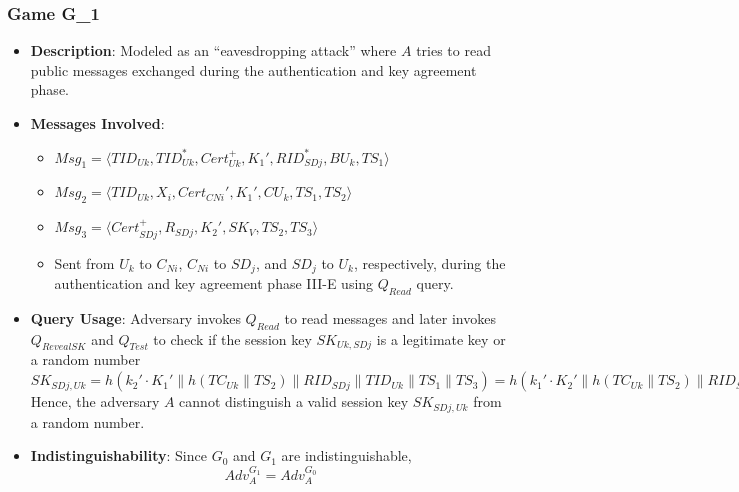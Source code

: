 \documentclass[9pt,handout]{beamer}
\begin{document}
\begin{frame}
    \frametitle{Game G_1}
    \begin{itemize}
        \item \textbf{Description}: Modeled as an “eavesdropping attack” where \( A \) tries to read public messages exchanged during the authentication and key agreement phase.
        \item \textbf{Messages Involved}:
            \begin{itemize}
                \item \( Msg_1 = \langle TID_{Uk}, TID^{*}_{Uk}, Cert^{+}_{Uk}, K_1', RID^{*}_{SDj}, BU_{k}, TS_1 \rangle \)
                \item \( Msg_2 = \langle TID_{Uk}, X_i, Cert_{CNi}', K_1', CU_{k}, TS_1, TS_2 \rangle \)
                \item \( Msg_3 = \langle Cert^{+}_{SDj}, R_{SDj}, K_2', SK_{V}, TS_2, TS_3 \rangle \)
                \item Sent from \( U_k \) to \( C_{Ni} \), \( C_{Ni} \) to \( SD_j \), and \( SD_j \) to \( U_k \), respectively, during the authentication and key agreement phase III-E using \( Q_{Read} \) query.
            \end{itemize}
        \item \textbf{Query Usage}: Adversary invokes \( Q_{Read} \) to read messages and later invokes \( Q_{RevealSK} \) and \( Q_{Test} \) to check if the session key \( SK_{Uk,SDj} \) is a legitimate key or a random number
        \(
            SK_{SDj,Uk} = h(k_2' \cdot K_1' \parallel h(TC_{Uk} \parallel TS_2) \parallel RID_{SDj} \parallel TID_{Uk} \parallel TS_1 \parallel TS_3) = h(k_1' \cdot K_2' \parallel h(TC_{Uk} \parallel TS_2) \parallel RID_{SDj} \parallel TID_{Uk} \parallel TS_1 \parallel TS_3) = SK_{Uk,SDj}
        \)
        Hence, the adversary \( A \) cannot distinguish a valid session key \( SK_{SDj,Uk} \) from a random number.
        \item \textbf{Indistinguishability}: Since \( G_0 \) and \( G_1 \) are indistinguishable,
        \[
            Adv_{A}^{G_1} = Adv_{A}^{G_0}
        \]
    \end{itemize}
\end{frame}
\end{document}
